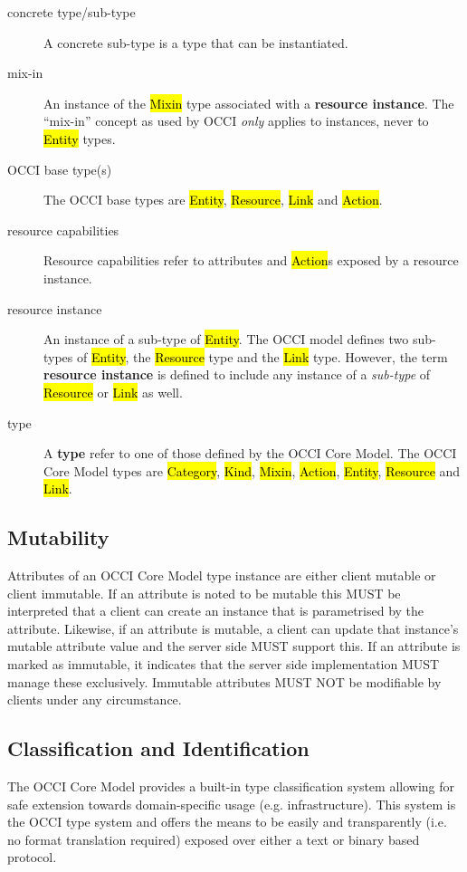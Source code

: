 \documentclass[10pt,a4paper]{article}
\begin{document}
\begin{description}
  \item[concrete type/sub-type] A concrete sub-type is a type that can
    be instantiated.
  \item[mix-in] An instance of the \hl{Mixin} type associated with a
    {\bf resource instance}. The ``mix-in'' concept as used by OCCI
    {\em only} applies to instances, never to \hl{Entity} types.
  \item[OCCI base type(s)] The OCCI base types are \hl{Entity},
    \hl{Resource}, \hl{Link} and \hl{Action}.
  \item[resource capabilities] Resource capabilities refer to
    attributes and \hl{Action}s exposed by a resource instance.
  \item[resource instance] An instance of a sub-type of
    \hl{Entity}. The OCCI model defines two sub-types of \hl{Entity},
    the \hl{Resource} type and the \hl{Link} type.  However, the term
    {\bf resource instance} is defined to include any instance of a
    {\em sub-type} of \hl{Resource} or \hl{Link} as well.
  \item[type] A {\bf type} refer to one of those defined by the OCCI
    Core Model.  The OCCI Core Model types are \hl{Category},
    \hl{Kind}, \hl{Mixin}, \hl{Action}, \hl{Entity}, \hl{Resource} and
    \hl{Link}.
\end{description}

\subsection{Mutability}
Attributes of an OCCI Core Model type instance are either client
mutable or client immutable. If an attribute is noted to be mutable
this MUST be interpreted that a client can create an instance that is
parametrised by the attribute. Likewise, if an attribute is mutable, a
client can update that instance's mutable attribute value and the
server side MUST support this. If an attribute is marked as immutable,
it indicates that the server side implementation MUST manage these
exclusively. Immutable attributes MUST NOT be modifiable by clients
under any circumstance.

\subsection{Classification and Identification}
\label{sec:classification}
The OCCI Core Model provides a built-in type classification system
allowing for safe extension towards domain-specific usage
(e.g. infrastructure). This system is the OCCI type system and offers
the means to be easily and transparently (i.e. no format translation
required) exposed over either a text or binary based protocol.
\end{document}
